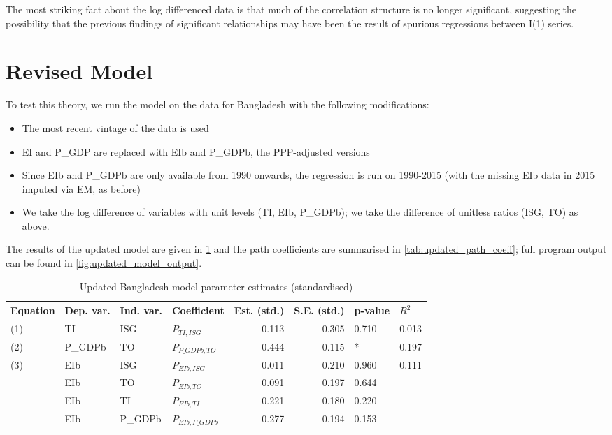 \documentclass[11pt,a4paper]{article}
\begin{document}
The most striking fact about the log differenced data is that much of the correlation structure is no longer significant, suggesting the possibility that the previous findings of significant relationships may have been the result of spurious regressions between I(1) series.

\section{Revised Model}\label{sec:revised_model}

To test this theory, we run the model on the data for Bangladesh with the following modifications:
\begin{itemize}
\item The most recent vintage of the data is used
\item EI and P\_GDP are replaced with EIb and P\_GDPb, the PPP-adjusted versions
\item Since EIb and P\_GDPb are only available from 1990 onwards, the regression is run on 1990-2015 (with the missing EIb data in 2015 imputed via EM, as before)
\item We take the log difference of variables with unit levels (TI, EIb, P\_GDPb); we take the difference of unitless ratios (ISG, TO) as above. 
\end{itemize}

The results of the updated model are given in \cref{tab:updated_estimates} and the path coefficients are summarised in \cref{tab:updated_path_coeff}; full program output can be found in  \cref{fig:updated_model_output}.

\begin{table}[tbp]
\centering
\begin{adjustbox}{max width=\textwidth}
\begin{tabular}{llllrrll}
\toprule
Equation & Dep. var. & Ind. var. &        Coefficient &  Est. (std.) &  S.E. (std.) & p-value & $R^{2}$ \\
\midrule
     (1) &        TI &       ISG &       $P_{TI,ISG}$ &        0.113 &        0.305 &   0.710 &   0.013 \\
     (2) &   P\_GDPb &        TO &   $P_{P\_GDPb,TO}$ &        0.444 &        0.115 &       * &   0.197 \\
     (3) &       EIb &       ISG &      $P_{EIb,ISG}$ &        0.011 &        0.210 &   0.960 &   0.111 \\
         &       EIb &        TO &       $P_{EIb,TO}$ &        0.091 &        0.197 &   0.644 &         \\
         &       EIb &        TI &       $P_{EIb,TI}$ &        0.221 &        0.180 &   0.220 &         \\
         &       EIb &   P\_GDPb &  $P_{EIb,P\_GDPb}$ &       -0.277 &        0.194 &   0.153 &         \\
\bottomrule
\end{tabular}
\end{adjustbox}
\caption{Updated Bangladesh model parameter estimates (standardised)}
\label{tab:updated_estimates}
\end{table}
\end{document}
